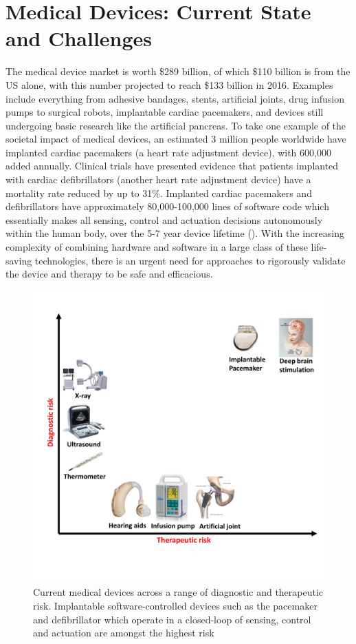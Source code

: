 \chapter{Medical Devices: Current State and Challenges}
The medical device market is worth \$289 billion, of which \$110 billion is from the US alone, with this number projected to reach \$133 billion in 2016.
Examples include everything from adhesive bandages, stents, artificial joints, drug infusion pumps to surgical robots, implantable cardiac pacemakers, and devices still undergoing basic research like the artificial pancreas.
To take one example of the societal impact of medical devices, an estimated 3 million people worldwide have implanted cardiac pacemakers (a heart rate adjustment device), with 600,000 added annually.
Clinical trials have presented evidence that patients implanted with cardiac defibrillators (another heart rate adjustment device) have a mortality rate reduced by up to 31\%.
Implanted cardiac pacemakers and defibrillators have approximately 80,000-100,000 lines of software code which essentially makes all sensing, control and actuation decisions autonomously within the human body, over the 5-7 year device lifetime (\cite{pauljones}). With the increasing complexity of combining hardware and software in a large class of these life-saving technologies, there is an urgent need for approaches to rigorously validate the device and therapy to be safe and efficacious.
\begin{figure}[t]
		\centering
		\includegraphics[width=\textwidth]{figs/devices_new.pdf}
		\caption{\small Current medical devices across a range of diagnostic and therapeutic risk. Implantable software-controlled devices such as the pacemaker and defibrillator which operate in a closed-loop of sensing, control and actuation are amongst the highest risk}
		\label{fig:Cur}
\end{figure}

